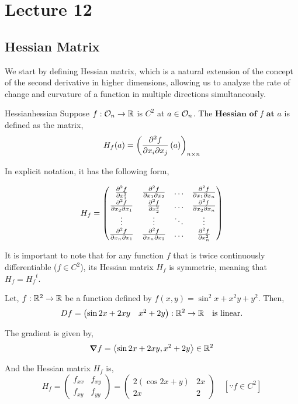\documentclass[../Analysis-3.tex]{subfiles}
\begin{document}
\chapter*{Lecture 12} %
\setcounter{chapter}{12} %
\setcounter{section}{0}
\setcounter{equation}{0}
\setcounter{figure}{0}


\section{Hessian Matrix}

We start by defining Hessian matrix, which is a natural extension of the concept of the second derivative in higher dimensions, allowing us to analyze the rate of change and curvature of a function in multiple directions simultaneously.

\begin{Def}{Hessian}{hessian}
  Suppose $f : \mathcal{O}_{n} \to \mathbb{R}$ is $C^2$ at $a \in \mathcal{O}_{n} $. The $\textbf{Hessian of $f$ at $a$}$ is defined as the matrix,
  \[ H_f(a) = \left( \pdv{f}{x_i}{x_j}\left( a \right) \right)_{n \times n} \]
\end{Def}

In explicit notation, it has the following form,

\[ H_{f} = \begin{pmatrix}
    \pdv[2]{f}{x_1}   & \pdv{f}{x_1}{x_2} & \ldots & \pdv{f}{x_1}{x_n} \\
    \pdv{f}{x_2}{x_1} & \pdv[2]{f}{x_2}   & \ldots & \pdv{f}{x_2}{x_n} \\
    \vdots            & \vdots            & \ddots & \vdots            \\
    \pdv{f}{x_n}{x_1} & \pdv{f}{x_n}{x_2} & \ldots & \pdv[2]{f}{x_n}
  \end{pmatrix} \]

It is important to note that for any function $f$ that is twice continuously differentiable ($f \in C^2$), its Hessian matrix $H_f$ is symmetric, meaning that $H_f = {H_f}^t$.

\begin{Eg}{}{}
  Let, $f : \mathbb{R}^2 \to \mathbb{R}$ be a function defined by $f(x,y) = \sin^2 x + x^2y + y^2$. Then,
  \[  Df = \begin{pmatrix}
      \sin2x + 2xy & x^2 + 2y
    \end{pmatrix} :  \mathbb{R}^2 \to \mathbb{R} \quad \text{is linear.}  \]

  The gradient is given by, \[  \grad f = \left\langle \sin2x + 2xy, x^2 + 2y \right\rangle \in \mathbb{R}^2  \]

  And the Hessian matrix $H_f$ is,
  \[ H_f = \begin{pmatrix}
      f_{xx} & f_{xy} \\
      f_{xy} & f_{yy}
    \end{pmatrix} = \begin{pmatrix}
      2( \cos2x + y) & 2x \\
      2x             & 2
    \end{pmatrix} \quad \left[ \because  f \in C^2 \right] \]

\end{Eg}
\end{document}
